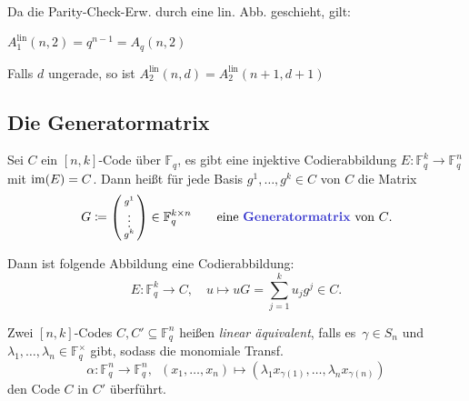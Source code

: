 \documentclass{cheat-sheet}
\newcommand{\F}{\mathbb{F}} %
\newcommand{\lin}{\text{lin}} %
\begin{document}
Da die Parity-Check-Erw. durch eine lin. Abb. geschieht, gilt:

\begin{satz}
  $A_1^\lin(n, 2) = q^{n-1} = A_q(n,2)$
\end{satz}

\begin{satz}
  Falls $d$ ungerade, so ist $A_2^\lin(n, d) = A_2^\lin(n+1, d+1)$
\end{satz}

\columnbreak



\subsection{Die Generatormatrix}

\begin{defn}
  Sei $C$ ein $[n,k]$-Code über $\F_q$, \dh{} es gibt eine injektive Codierabbildung $E : \F_q^k \to \F_q^n$ mit $\operatorname{im}(E) = C$.
  Dann heißt für jede Basis $g^1, \ldots, g^k \in C$ von $C$ die Matrix
  \[
    G \coloneqq \begin{psmallmatrix}
      g^1 \\ \vdots \\ g^k
    \end{psmallmatrix} \in \F_q^{k \times n} \qquad
    \text{eine \emph{Generatormatrix} von $C$.}
  \]
\end{defn}

\begin{bem}
  Dann ist folgende Abbildung eine Codierabbildung:
  \[
    E : \F_q^k \to C, \quad
    u \mapsto uG = {\sum}_{j=1}^k u_j g^j \in C.
  \]
\end{bem}


\begin{defn}
  Zwei $[n,k]$-Codes $C, C' \subseteq \F_q^n$ heißen \emph{linear äquivalent}, falls es~$\gamma \in S_n$ und $\lambda_1, \ldots, \lambda_n \in \F_q^{\times}$ gibt, sodass die monomiale Transf. \[ \alpha : \F_q^n \to \F_q^n, \enspace (x_1, \ldots, x_n) \mapsto (\lambda_1 x_{\gamma(1)}, \ldots, \lambda_n x_{\gamma(n)}) \]
  den Code $C$ in $C'$ überführt.
\end{defn}

\iffalse
\begin{bspe}
  binäre $[5, 2, 3]$-Codes
  
  $C_1$ hat Generatormatrix $G_1 = \begin{psmallmatrix}
    11100 \\
    00111
  \end{psmallmatrix}$,
  $C_1 = \{ 00000, 111100, 00111, 11011 \}$
  
  $C_2$ hat Generatormatrix $G_2 = \begin{psmallmatrix}
    011001 \\
    10110
  \end{psmallmatrix}$
  $C_2 = \{ 00000, 01101, 10110, 11011 \}$
\end{bspe}
\fi
\end{document}
